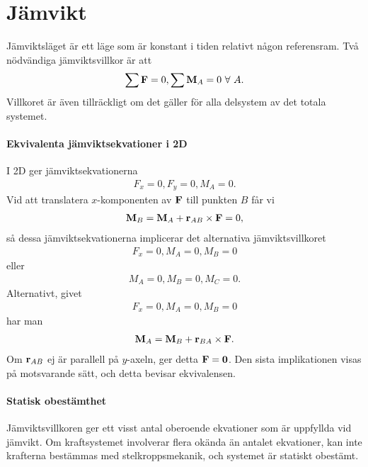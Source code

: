 \section{Jämvikt}
Jämviktsläget är ett läge som är konstant i tiden relativt någon referensram. Två nödvändiga jämviktsvillkor är att
\begin{align*}
	\sum\vect{F} = 0, \sum\vect{M}_A = 0\ \forall\ A.
\end{align*}
Villkoret är även tillräckligt om det gäller för alla delsystem av det totala systemet.

\paragraph{Ekvivalenta jämviktsekvationer i 2D}
I 2D ger jämviktsekvationerna
\begin{align*}
	F_x = 0, F_y = 0, M_A = 0.
\end{align*}
Vid att translatera $x$-komponenten av $\vect{F}$ till punkten $B$ får vi
\begin{align*}
	\vect{M}_{B} = \vect{M}_A + \vect{r}_{AB}\times\vect{F} = 0,
\end{align*}
så dessa jämviktsekvationerna implicerar det alternativa jämviktsvillkoret
\begin{align*}
	F_x = 0, M_A = 0, M_B = 0
\end{align*}
eller
\begin{align*}
	M_A = 0, M_B = 0, M_C = 0.
\end{align*}
Alternativt, givet
\begin{align*}
	F_x = 0, M_A = 0, M_B = 0
\end{align*}
har man
\begin{align*}
	\vect{M}_A = \vect{M}_B + \vect{r}_{BA}\times\vect{F}.
\end{align*}
Om $\vect{r}_{AB}$ ej är parallell på $y$-axeln, ger detta $\vect{F} = \vect{0}$. Den sista implikationen visas på motsvarande sätt, och detta bevisar ekvivalensen.

\paragraph{Statisk obestämthet}
Jämviktsvillkoren ger ett visst antal oberoende ekvationer som är uppfyllda vid jämvikt. Om kraftsystemet involverar flera okända än antalet ekvationer, kan inte krafterna bestämmas med stelkroppsmekanik, och systemet är statiskt obestämt.